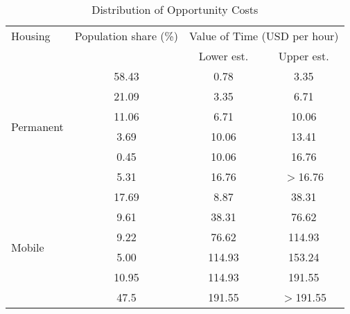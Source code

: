 \begin{table}[!htbp]
\caption{Distribution of Opportunity Costs}\label{opp_costs}
\centering
\begin{tabular}{lccc}
  \hline \hline
Housing & Population share (\%) & \multicolumn{2}{c}{Value of Time (USD per hour)} \\ 
 &  & Lower est. & Upper est. \\ 
  \hline
\multirow[c]{6}{*}{Permanent}  & 58.43 & 0.78 & 3.35 \\ 
 & 21.09 & 3.35 & 6.71 \\ 
 & 11.06 & 6.71 & 10.06 \\ 
  & 3.69 & 10.06 & 13.41 \\ 
 & 0.45 & 10.06 & 16.76 \\ 
 & 5.31 & 16.76 & $>$16.76 \\ 
\hline
\multirow[c]{6}{*}{Mobile} & 17.69 & 8.87 & 38.31 \\ 
 & 9.61 & 38.31 & 76.62 \\ 
 & 9.22 & 76.62 & 114.93 \\ 
& 5.00 & 114.93 & 153.24 \\ 
& 10.95 & 114.93 & 191.55 \\ 
 & 47.5 & 191.55 & $>$191.55 \\ 

   \hline
\end{tabular}
\end{table}
